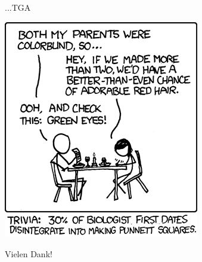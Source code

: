 \documentclass[12pt,a4paper]{beamer}
\begin{document}
\begin{frame}{...TGA}
	\begin{center}
		\includegraphics[scale=0.41]{xkcd.png}
		
		Vielen Dank! 
	\end{center}
\end{frame}
\end{document}
